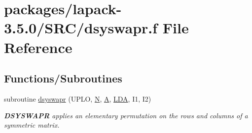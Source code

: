 \hypertarget{dsyswapr_8f}{}\section{packages/lapack-\/3.5.0/\+S\+R\+C/dsyswapr.f File Reference}
\label{dsyswapr_8f}
\subsection*{Functions/\+Subroutines}
\begin{DoxyCompactItemize}
\item 
subroutine \hyperlink{group__doubleSYauxiliary_ga5f95b3cae2a8dc2bdb7f6e336d0c297f}{dsyswapr} (U\+P\+L\+O, \hyperlink{polmisc_8c_a0240ac851181b84ac374872dc5434ee4}{N}, \hyperlink{classA}{A}, \hyperlink{example__user_8c_ae946da542ce0db94dced19b2ecefd1aa}{L\+D\+A}, I1, I2)
\begin{DoxyCompactList}\small\item\em {\bfseries D\+S\+Y\+S\+W\+A\+P\+R} applies an elementary permutation on the rows and columns of a symmetric matrix. \end{DoxyCompactList}\end{DoxyCompactItemize}
